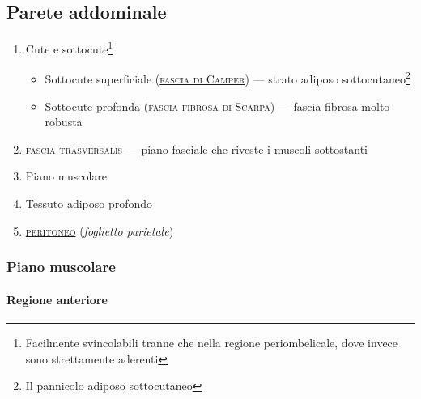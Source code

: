 \documentclass[italian,]{article}
\providecommand{\tightlist}{%
  \setlength{\itemsep}{0pt}\setlength{\parskip}{0pt}}
\renewcommand{\a}[1]{\underline{\textsc{#1}}}
\begin{document}
\hypertarget{parete-addominale}{%
\subsection{Parete addominale}\label{parete-addominale}}

\begin{enumerate}
\def\labelenumi{\arabic{enumi}.}
\tightlist
\item
  Cute e sottocute\footnote{Facilmente svincolabili tranne che nella
    regione periombelicale, dove invece sono strettamente aderenti}

  \begin{itemize}
  \tightlist
  \item
    Sottocute superficiale (\a{fascia di Camper}) --- strato adiposo
    sottocutaneo\footnote{Il pannicolo adiposo sottocutaneo}
  \item
    Sottocute profonda (\a{fascia fibrosa di Scarpa}) --- fascia fibrosa
    molto robusta
  \end{itemize}
\item
  \a{fascia trasversalis} --- piano fasciale che riveste i muscoli
  sottostanti
\item
  Piano muscolare
\item
  Tessuto adiposo profondo
\item
  \a{peritoneo} (\emph{foglietto parietale})
\end{enumerate}

\hypertarget{piano-muscolare}{%
\subsubsection{Piano muscolare}\label{piano-muscolare}}

\hypertarget{regione-anteriore}{%
\paragraph{Regione anteriore}\label{regione-anteriore}}
\end{document}
